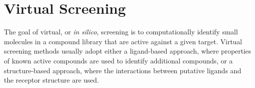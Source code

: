 \section{Virtual Screening}

The goal of virtual, or \textit{in silico}, screening is to computationally identify small molecules in a compound library that are active against a given target.  Virtual screening methods usually adopt either a ligand-based approach, where properties of known active compounds are used to identify additional compounds, or a structure-based approach, where the interactions between putative ligands and the receptor structure are used.
